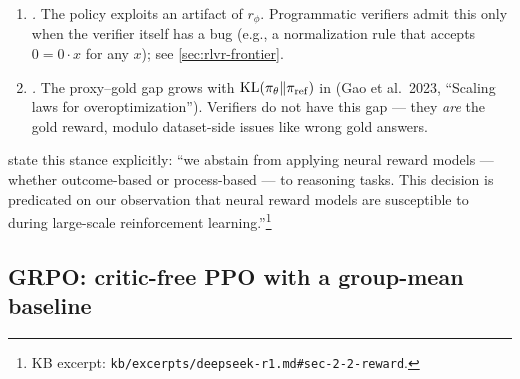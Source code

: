\begin{enumerate}
\item \emph{.} The policy exploits an artifact of
$r_\phi$. Programmatic verifiers admit this only when the verifier
itself has a bug (e.g., a normalization rule that accepts
$0 = 0\cdot x$ for any $x$); see \cref{sec:rlvr-frontier}.
\item \emph{.} The proxy--gold gap grows with
$\operatorname{KL}(\pi_\theta \| \pi_{\mathrm{ref}})$ in  (Gao et al.\ 2023,
``Scaling laws for  overoptimization'').
 Verifiers do not have this gap — they
\emph{are} the gold reward, modulo dataset-side issues like wrong gold
answers.
\end{enumerate}

\citet[\S 2.2]{deepseek-r1} state this stance explicitly: ``we abstain
from applying neural reward models — whether outcome-based or
process-based — to reasoning tasks. This decision is predicated on our
observation that neural reward models are susceptible to 
during large-scale reinforcement learning.''\footnote{KB excerpt:
\nolinkurl{kb/excerpts/deepseek-r1.md#sec-2-2-reward}.}

\subsection{GRPO: critic-free PPO with a group-mean baseline}
\label{sec:rlvr-grpo-objective}

